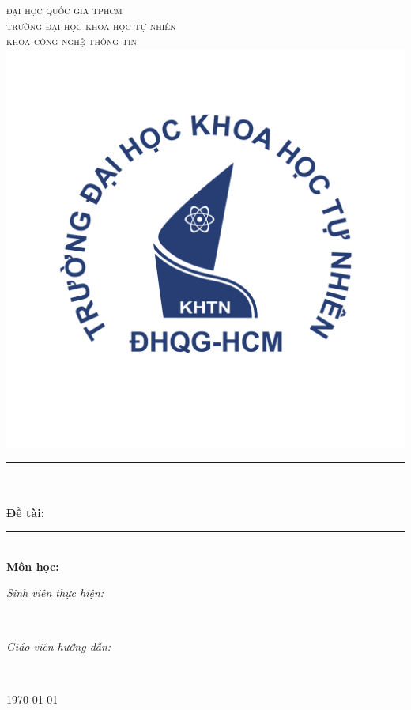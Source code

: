 \begin{titlepage}
\newcommand{\HRule}{\rule{\linewidth}{0.5mm}}
\centering

\textsc{\LARGE đại học quốc gia tphcm}\\[0.5cm]
\textsc{\Large trường đại học khoa học tự nhiên}\\[0.5cm]
\textsc{\large khoa công nghệ thông tin}\\[0.5cm]

\includegraphics[scale=.25]{img/hcmus-logo.png} 

\HRule \\[0.4cm]
{ 
\huge{\bfseries{\reporttitle}}\\[0.5cm]
\large{\bfseries{Đề tài: \reportname}}
}\\[0.4cm]
\HRule \\[0.5cm]

\textbf{\large Môn học: \coursename}\\[0.5cm]

\begin{minipage}[t]{0.5\textwidth}
\begin{flushleft} \large
\emph{Sinh viên thực hiện:}\\
\studentname
\end{flushleft}
\end{minipage}
~
\begin{minipage}[t]{0.4\textwidth}
\begin{flushright} \large
\emph{Giáo viên hướng dẫn:} \\
\teachername
\end{flushright}
\end{minipage}\\[2cm]

\begin{minipage}[b]{\textwidth}
    \centering
    \large   
    \today

    \vspace{-4cm} 
\end{minipage}%

\vfill
\end{titlepage}